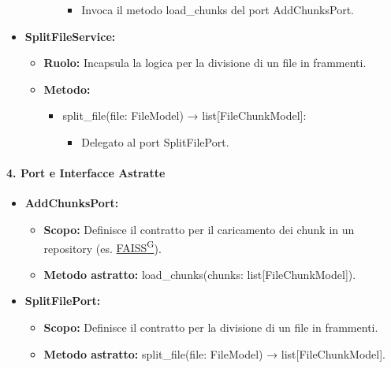 \begin{itemize}
\begin{itemize}
\begin{itemize}
                \begin{itemize}
                    \item Invoca il metodo load\_chunks del port AddChunksPort.
                \end{itemize}
            \end{itemize}
        \end{itemize}
        \item \textbf{SplitFileService:}
        \begin{itemize}
            \item \textbf{Ruolo:} Incapsula la logica per la divisione di un file in frammenti.
            \item \textbf{Metodo:}
            \begin{itemize}
                \item split\_file(file: FileModel) → list[FileChunkModel]:
                \begin{itemize}
                    \item Delegato al port SplitFilePort.
                \end{itemize}
            \end{itemize}
        \end{itemize}
    \end{itemize}

    \paragraph{4. Port e Interfacce Astratte}
    \begin{itemize}
        \item \textbf{AddChunksPort:}
        \begin{itemize}
            \item \textbf{Scopo:} Definisce il contratto per il caricamento dei chunk in un repository (es. \href{https://code7crusaders.github.io/docs/PB/documentazione_interna/glossario.html#faiss}{FAISS\textsuperscript{G}}).
            \item \textbf{Metodo astratto:} load\_chunks(chunks: list[FileChunkModel]).
        \end{itemize}
        \item \textbf{SplitFilePort:}
        \begin{itemize}
            \item \textbf{Scopo:} Definisce il contratto per la divisione di un file in frammenti.
            \item \textbf{Metodo astratto:} split\_file(file: FileModel) → list[FileChunkModel].
        \end{itemize}
    \end{itemize}

